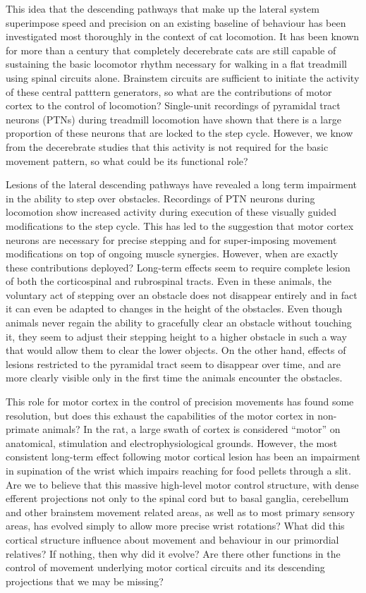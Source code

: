 This idea that the descending pathways that make up the lateral system superimpose speed and precision on an existing baseline of behaviour has been investigated most thoroughly in the context of cat locomotion. It has been known for more than a century that completely decerebrate cats are still capable of sustaining the basic locomotor rhythm necessary for walking in a flat treadmill using spinal circuits alone. Brainstem circuits are sufficient to initiate the activity of these central patttern generators, so what are the contributions of motor cortex to the control of locomotion? Single-unit recordings of pyramidal tract neurons (PTNs) during treadmill locomotion have shown that there is a large proportion of these neurons that are locked to the step cycle. However, we know from the decerebrate studies that this activity is not required for the basic movement pattern, so what could be its functional role?

Lesions of the lateral descending pathways have revealed a long term impairment in the ability to step over obstacles. Recordings of PTN neurons during locomotion show increased activity during execution of these visually guided modifications to the step cycle. This has led to the suggestion that motor cortex neurons are necessary for precise stepping and for super-imposing movement modifications on top of ongoing muscle synergies. However, when are exactly these contributions deployed? Long-term effects seem to require complete lesion of both the corticospinal and rubrospinal tracts. Even in these animals, the voluntary act of stepping over an obstacle does not disappear entirely and in fact it can even be adapted to changes in the height of the obstacles. Even though animals never regain the ability to gracefully clear an obstacle without touching it, they seem to adjust their stepping height to a higher obstacle in such a way that would allow them to clear the lower objects. On the other hand, effects of lesions restricted to the pyramidal tract seem to disappear over time, and are more clearly visible only in the first time the animals encounter the obstacles.

This role for motor cortex in the control of precision movements has found some resolution, but does this exhaust the capabilities of the motor cortex in non-primate animals? In the rat, a large swath of cortex is considered ``motor'' on anatomical, stimulation and electrophysiological grounds. However, the most consistent long-term effect following motor cortical lesion has been an impairment in supination of the wrist which impairs reaching for food pellets through a slit. Are we to believe that this massive high-level motor control structure, with dense efferent projections not only to the spinal cord but to basal ganglia, cerebellum and other brainstem movement related areas, as well as to most primary sensory areas, has evolved simply to allow more precise wrist rotations? What did this cortical structure influence about movement and behaviour in our primordial relatives? If nothing, then why did it evolve? Are there other functions in the control of movement underlying motor cortical circuits and its descending projections that we may be missing?

